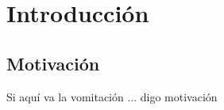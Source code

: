 \chapter{Introducción}
\label{intro}

\section{Motivación}

Si aquí va la vomitación ... digo motivación 